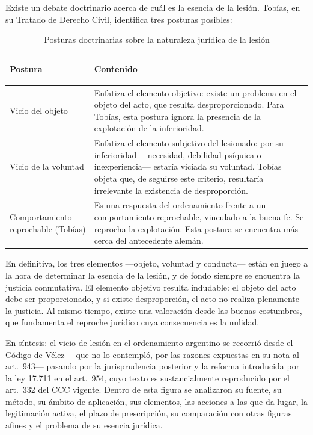 \documentclass[12pt,oneside]{book}
\begin{document}
Existe un debate doctrinario acerca de cuál es la esencia de la lesión. Tobías, en su Tratado de Derecho Civil, identifica tres posturas posibles:

\begin{table}[H]
\centering
\caption{Posturas doctrinarias sobre la naturaleza jurídica de la lesión}
\begin{tabularx}{\textwidth}{>{\bfseries\raggedright\arraybackslash}p{} X}
\toprule
\textbf{Postura} & \textbf{Contenido} \\
\midrule
Vicio del objeto & Enfatiza el elemento objetivo: existe un problema en el objeto del acto, que resulta desproporcionado. Para Tobías, esta postura ignora la presencia de la explotación de la inferioridad. \\
Vicio de la voluntad & Enfatiza el elemento subjetivo del lesionado: por su inferioridad ---necesidad, debilidad psíquica o inexperiencia--- estaría viciada su voluntad. Tobías objeta que, de seguirse este criterio, resultaría irrelevante la existencia de desproporción. \\
Comportamiento reprochable (Tobías) & Es una respuesta del ordenamiento frente a un comportamiento reprochable, vinculado a la buena fe. Se reprocha la explotación. Esta postura se encuentra más cerca del antecedente alemán. \\
\bottomrule
\end{tabularx}
\end{table}

En definitiva, los tres elementos ---objeto, voluntad y conducta--- están en juego a la hora de determinar la esencia de la lesión, y de fondo siempre se encuentra la justicia conmutativa. El elemento objetivo resulta indudable: el objeto del acto debe ser proporcionado, y si existe desproporción, el acto no realiza plenamente la justicia. Al mismo tiempo, existe una valoración desde las buenas costumbres, que fundamenta el reproche jurídico cuya consecuencia es la nulidad.

\begin{nota}
En síntesis: el vicio de lesión en el ordenamiento argentino se recorrió desde el Código de Vélez ---que no lo contempló, por las razones expuestas en su nota al art.\ 943--- pasando por la jurisprudencia posterior y la reforma introducida por la ley 17.711 en el art.\ 954, cuyo texto es sustancialmente reproducido por el art.\ 332 del CCC vigente. Dentro de esta figura se analizaron su fuente, su método, su ámbito de aplicación, sus elementos, las acciones a las que da lugar, la legitimación activa, el plazo de prescripción, su comparación con otras figuras afines y el problema de su esencia jurídica.
\end{nota}
\end{document}
